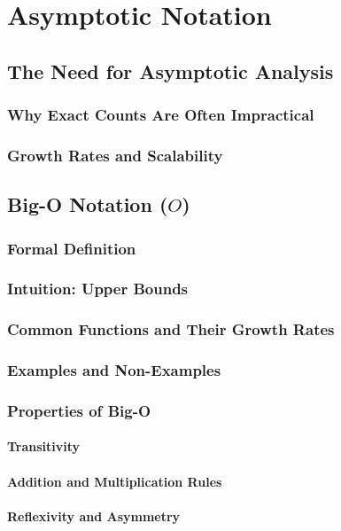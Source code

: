 \chapter{Asymptotic Notation}
\section{The Need for Asymptotic Analysis}
\subsection{Why Exact Counts Are Often Impractical}
\subsection{Growth Rates and Scalability}

\section{Big-O Notation ($O$)}
\subsection{Formal Definition}
\subsection{Intuition: Upper Bounds}
\subsection{Common Functions and Their Growth Rates}
\subsection{Examples and Non-Examples}
\subsection{Properties of Big-O}
\subsubsection{Transitivity}
\subsubsection{Addition and Multiplication Rules}
\subsubsection{Reflexivity and Asymmetry}

